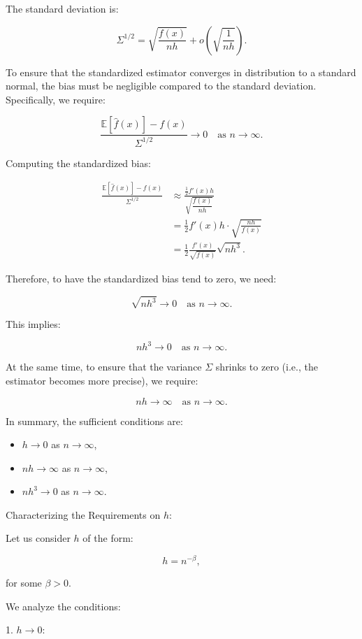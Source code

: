 \documentclass{article}
\begin{document}
The standard deviation is:

\[
\Sigma^{1/2} = \sqrt{\frac{f(x)}{n h}} + o\left( \sqrt{\frac{1}{n h}} \right).
\]

To ensure that the standardized estimator converges in distribution to a standard normal, the bias must be negligible compared to the standard deviation. Specifically, we require:

\[
\frac{\mathbb{E}[\hat{f}(x)] - f(x)}{\Sigma^{1/2}} \to 0 \quad \text{as } n \to \infty.
\]

Computing the standardized bias:

\[
\begin{aligned}
\frac{\mathbb{E}[\hat{f}(x)] - f(x)}{\Sigma^{1/2}} &\approx \frac{\frac{1}{2} f'(x) h}{\sqrt{\dfrac{f(x)}{n h}}} \\
&= \frac{1}{2} f'(x) h \cdot \sqrt{\frac{n h}{f(x)}} \\
&= \frac{1}{2} \frac{f'(x)}{\sqrt{f(x)}} \sqrt{n h^3}.
\end{aligned}
\]

Therefore, to have the standardized bias tend to zero, we need:

\[
\sqrt{n h^3} \to 0 \quad \text{as } n \to \infty.
\]

This implies:

\[
n h^3 \to 0 \quad \text{as } n \to \infty.
\]

At the same time, to ensure that the variance \(\Sigma\) shrinks to zero (i.e., the estimator becomes more precise), we require:

\[
n h \to \infty \quad \text{as } n \to \infty.
\]

In summary, the sufficient conditions are:

\begin{itemize}
    \item \( h \to 0 \) as \( n \to \infty \),
    \item \( n h \to \infty \) as \( n \to \infty \),
    \item \( n h^3 \to 0 \) as \( n \to \infty \).
\end{itemize}

Characterizing the Requirements on \( h \):

Let us consider \( h \) of the form:

\[
h = n^{-\beta},
\]

for some \( \beta > 0 \).

We analyze the conditions:

1. \( h \to 0 \):
\end{document}
